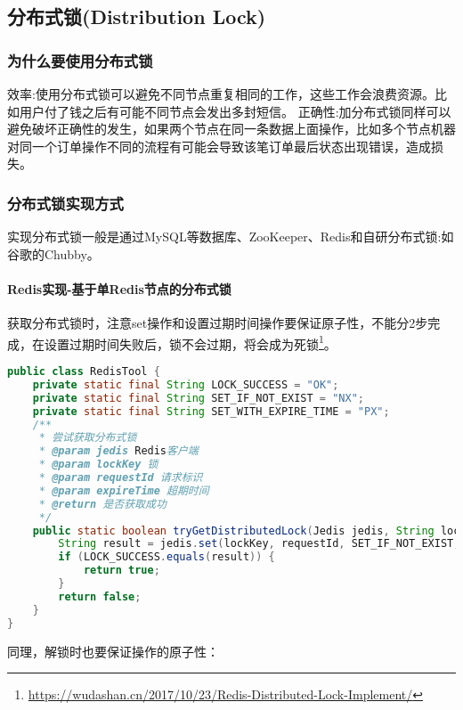 \documentclass[../../../interview-questions.tex]{subfiles}
\begin{document}
\subsection{分布式锁(Distribution Lock)}

\subsubsection{为什么要使用分布式锁}

效率:使用分布式锁可以避免不同节点重复相同的工作，这些工作会浪费资源。比如用户付了钱之后有可能不同节点会发出多封短信。
正确性:加分布式锁同样可以避免破坏正确性的发生，如果两个节点在同一条数据上面操作，比如多个节点机器对同一个订单操作不同的流程有可能会导致该笔订单最后状态出现错误，造成损失。

\subsubsection{分布式锁实现方式}

实现分布式锁一般是通过MySQL等数据库、ZooKeeper、Redis和自研分布式锁:如谷歌的Chubby。

\paragraph{Redis实现-基于单Redis节点的分布式锁}

获取分布式锁时，注意set操作和设置过期时间操作要保证原子性，不能分2步完成，在设置过期时间失败后，锁不会过期，将会成为死锁\footnote{\url{https://wudashan.cn/2017/10/23/Redis-Distributed-Lock-Implement/}}。

\begin{lstlisting}[language=Java]
public class RedisTool {
    private static final String LOCK_SUCCESS = "OK";
    private static final String SET_IF_NOT_EXIST = "NX";
    private static final String SET_WITH_EXPIRE_TIME = "PX";
    /**
     * 尝试获取分布式锁
     * @param jedis Redis客户端
     * @param lockKey 锁
     * @param requestId 请求标识
     * @param expireTime 超期时间
     * @return 是否获取成功
     */
    public static boolean tryGetDistributedLock(Jedis jedis, String lockKey, String requestId, int expireTime) {
        String result = jedis.set(lockKey, requestId, SET_IF_NOT_EXIST, SET_WITH_EXPIRE_TIME, expireTime);
        if (LOCK_SUCCESS.equals(result)) {
            return true;
        }
        return false;
    }
}
\end{lstlisting}

同理，解锁时也要保证操作的原子性：
\end{document}
